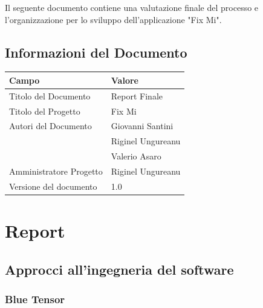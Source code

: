 \documentclass{report}
\begin{document}
	Il seguente documento contiene una valutazione finale del processo e l'organizzazione per lo sviluppo dell'applicazione "Fix Mi".
	
	\section{Informazioni del Documento}
	
	\begin{center} %
		\centering
		\begin{tabular}{ |p{4cm}|p{4cm}|  }
			\hline
			\centering Campo & \qquad\qquad Valore \\ %
			\hline
			Titolo del Documento & Report Finale \\
			\hline
			Titolo del Progetto & Fix Mi \\
			\hline
			Autori del Documento &
			Giovanni Santini \\ & Riginel Ungureanu \\ & Valerio Asaro \\
			\hline
			Amministratore Progetto & Riginel Ungureanu\\
			\hline
			Versione del documento & 1.0 \\
			\hline
		\end{tabular}
	\end{center}
	
	
	
\chapter{Report}

\section{Approcci all'ingegneria del software}

\subsection{Blue Tensor}
\end{document}
